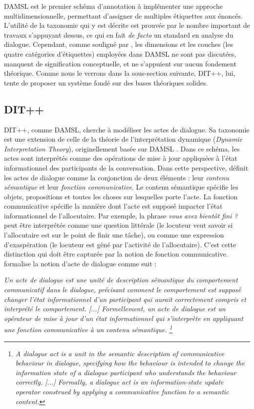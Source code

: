 \documentclass[10pt,a4paper,twoside]{article}
\begin{document}
DAMSL est le premier schéma d'annotation à implémenter une approche multidimensionnelle, permettant d'assigner de multiples étiquettes aux énoncés. L'utilité de la taxonomie qui y est décrite est prouvée par le nombre important de travaux s'appuyant dessus, ce qui en fait \textit{de facto} un standard en analyse du dialogue. Cependant, comme souligné par \citet{bunt2006dimensions}, les dimensions et les \og couches \fg{} (les quatre catégories d'étiquettes) employées dans DAMSL ne sont pas discutées, manquent de signification conceptuelle, et ne s'appuient sur aucun fondement théorique. Comme nous le verrons dans la sous-section suivante, DIT++, lui, tente de proposer un système fondé sur des bases théoriques solides.

\subsection{DIT++}
\label{subsec:DIT}

DIT++, comme DAMSL, cherche à modéliser les actes de dialogue. Sa taxonomie est une extension de celle de la théorie de l'interprétation dynamique (\textit{Dynamic Interpretation Theory}), originellement basée sur DAMSL \cite{bunt2009dit++}. Dans ce schéma, les actes sont interprétés comme des opérations de mise à jour appliquées à l'état informationnel des participants de la conversation. Dans cette perspective, \citeauthor{bunt2009dit++} définit les actes de dialogue comme la conjonction de deux éléments : leur \textit{contenu sémantique} et leur \textit{fonction communicative}. Le contenu sémantique spécifie les objets, propositions et toutes les choses sur lesquelles porte l'acte. La fonction communicative spécifie la manière dont l'acte est supposé impacter l'état informationnel de l'allocutaire. Par exemple, la phrase \og \textit{vous avez bientôt fini ?} \fg{} peut être interprétée comme une question littérale (le locuteur veut savoir si l'allocutaire est sur le point de finir une tâche), ou comme une expression d'exaspération (le locuteur est gêné par l'activité de l'allocutaire). C'est cette distinction qui doit être capturée par la notion de fonction communicative. \citeauthor{bunt2006dimensions} formalise la notion d'acte de dialogue comme suit \cite[p. 13]{bunt2009dit++} :

\begin{displayquote}
\og \textit{Un acte de dialogue est une unité de description sémantique du comportement communicatif dans le dialogue, précisant comment le comportement est supposé changer l'état informationnel d'un participant qui aurait correctement compris et interprété le comportement. [...] Formellement, un acte de dialogue est un opérateur de mise à jour d'un état informationnel qui s’interprète en appliquant une fonction communicative à un contenu sémantique. \footnote{\textit{\og A dialogue act is a unit in the semantic description of communicative behaviour in dialogue, specifying how the behaviour is intended to change the information state of a dialogue participant who understands the behaviour correctly. [...] Formally, a dialogue act is an information-state update operator construed by applying a communicative function to a semantic content.} \fg}} \fg
\end{displayquote}
\end{document}
